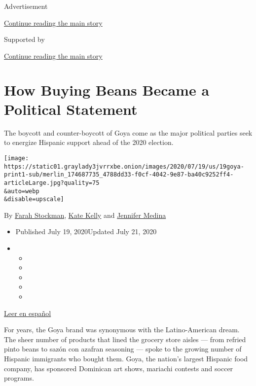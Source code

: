 Advertisement

\protect\hyperlink{after-top}{Continue reading the main story}

Supported by

\protect\hyperlink{after-sponsor}{Continue reading the main story}

\hypertarget{how-buying-beans-became-a-political-statement}{%
\section{How Buying Beans Became a Political
Statement}\label{how-buying-beans-became-a-political-statement}}

The boycott and counter-boycott of Goya come as the major political
parties seek to energize Hispanic support ahead of the 2020 election.

\texttt{[image: https://static01.graylady3jvrrxbe.onion/images/2020/07/19/us/19goya-print1-sub/merlin\_174687735\_4788dd33-f0cf-4042-9e87-ba40c9252ff4-articleLarge.jpg?quality=75\\\&auto=webp\\\&disable=upscale]}

By \href{https://www.nytimes3xbfgragh.onion/by/farah-stockman}{Farah
Stockman}, \href{https://www.nytimes3xbfgragh.onion/by/kate-kelly}{Kate
Kelly} and
\href{https://www.nytimes3xbfgragh.onion/by/jennifer-medina}{Jennifer
Medina}

\begin{itemize}
\item
  Published July 19, 2020Updated July 21, 2020
\item
  \begin{itemize}
  \item
  \item
  \item
  \item
  \item
  \end{itemize}
\end{itemize}

\href{https://www.nytimes3xbfgragh.onion/es/2020/07/19/espanol/goya-boicot-trump.html}{Leer
en español}

For years, the Goya brand was synonymous with the Latino-American dream.
The sheer number of products that lined the grocery store aisles ---
from refried pinto beans to sazón con azafran seasoning --- spoke to the
growing number of Hispanic immigrants who bought them. Goya, the
nation's largest Hispanic food company, has sponsored Dominican art
shows, mariachi contests and soccer programs.

